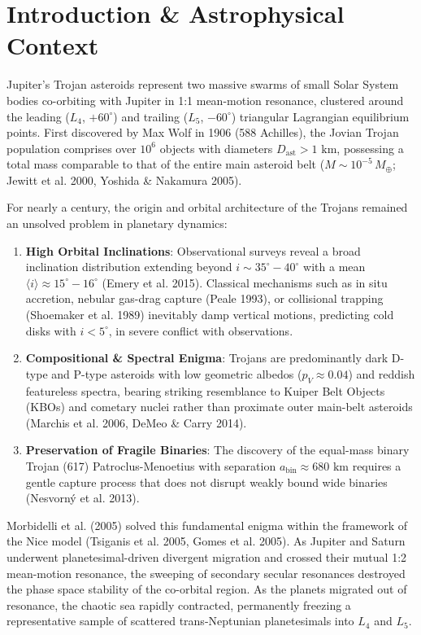 \documentclass[11pt,a4paper]{article}
\begin{document}
\section{Introduction \& Astrophysical Context}
Jupiter's Trojan asteroids represent two massive swarms of small Solar System bodies co-orbiting with Jupiter in 1:1 mean-motion resonance, clustered around the leading ($L_4$, $+60^\circ$) and trailing ($L_5$, $-60^\circ$) triangular Lagrangian equilibrium points. First discovered by Max Wolf in 1906 (588 Achilles), the Jovian Trojan population comprises over $10^6$ objects with diameters $D_{\text{ast}} > 1\text{ km}$, possessing a total mass comparable to that of the entire main asteroid belt ($M \sim 10^{-5}\,M_\oplus$; Jewitt et al. 2000, Yoshida \& Nakamura 2005).

For nearly a century, the origin and orbital architecture of the Trojans remained an unsolved problem in planetary dynamics:
\begin{enumerate}
    \item \textbf{High Orbital Inclinations}: Observational surveys reveal a broad inclination distribution extending beyond $i \sim 35^\circ-40^\circ$ with a mean $\langle i \rangle \approx 15^\circ-16^\circ$ (Emery et al. 2015). Classical mechanisms such as in situ accretion, nebular gas-drag capture (Peale 1993), or collisional trapping (Shoemaker et al. 1989) inevitably damp vertical motions, predicting cold disks with $i < 5^\circ$, in severe conflict with observations.
    \item \textbf{Compositional \& Spectral Enigma}: Trojans are predominantly dark D-type and P-type asteroids with low geometric albedos ($p_V \approx 0.04$) and reddish featureless spectra, bearing striking resemblance to Kuiper Belt Objects (KBOs) and cometary nuclei rather than proximate outer main-belt asteroids (Marchis et al. 2006, DeMeo \& Carry 2014).
    \item \textbf{Preservation of Fragile Binaries}: The discovery of the equal-mass binary Trojan (617) Patroclus-Menoetius with separation $a_{\text{bin}} \approx 680\text{ km}$ requires a gentle capture process that does not disrupt weakly bound wide binaries (Nesvorn{\'y} et al. 2013).
\end{enumerate}

Morbidelli et al. (2005) solved this fundamental enigma within the framework of the Nice model (Tsiganis et al. 2005, Gomes et al. 2005). As Jupiter and Saturn underwent planetesimal-driven divergent migration and crossed their mutual 1:2 mean-motion resonance, the sweeping of secondary secular resonances destroyed the phase space stability of the co-orbital region. As the planets migrated out of resonance, the chaotic sea rapidly contracted, permanently freezing a representative sample of scattered trans-Neptunian planetesimals into $L_4$ and $L_5$.
\end{document}
